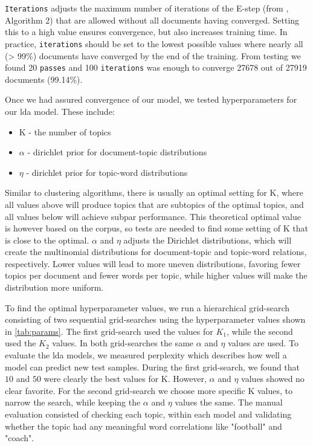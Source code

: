 \texttt{Iterations} adjusts the maximum number of iterations of the E-step (from \citeauthor{blei2010online}\cite{blei2010online}, Algorithm 2) that are allowed without all documents having converged. 
Setting this to a high value ensures convergence, but also increases training time. 
In practice, \texttt{iterations} should be set to the lowest possible values where nearly all (> 99\%) documents have converged by the end of the training.
From testing we found 20 \texttt{passes} and 100 \texttt{iterations} was enough to converge 27678 out of 27919 documents (99.14\%).

Once we had assured convergence of our model, we tested hyperparameters for our \gls{lda} model.
These include:
\begin{itemize}
	\item K - the number of topics
	\item $\alpha$ - dirichlet prior for document-topic distributions
	\item $\eta$ - dirichlet prior for topic-word distributions
\end{itemize}
Similar to clustering algorithms, there is usually an optimal setting for K, where all values above will produce topics that are subtopics of the optimal topics, and all values below will achieve subpar performance.
This theoretical optimal value is however based on the corpus, so tests are needed to find some setting of K that is close to the optimal.
$\alpha$ and $\eta$ adjusts the Dirichlet distributions, which will create the multinomial distributions for document-topic and topic-word relations, respectively.
Lower values will lead to more uneven distributions, favoring fewer topics per document and fewer words per topic, while higher values will make the distribution more uniform.

To find the optimal hyperparameter values, we run a hierarchical grid-search consisting of two sequential grid-searches using the hyperparameter values shown in \autoref{tab:params}.
The first grid-search used the values for $K_1$, while the second used the $K_2$ values.
In both grid-searches the same $\alpha$ and $\eta$ values are used.
To evaluate the \gls{lda} models, we measured perplexity which describes how well a model can predict new test samples. 
During the first grid-search, we found that $10$ and $50$ were clearly the best values for K.
However, $\alpha$ and $\eta$ values showed no clear favorite.
For the second grid-search we choose more specific K values, to narrow the search, while keeping the $\alpha$ and $\eta$ values the same.
The manual evaluation consisted of checking each topic, within each model and validating whether the topic had any meaningful word correlations like "football" and "coach".


